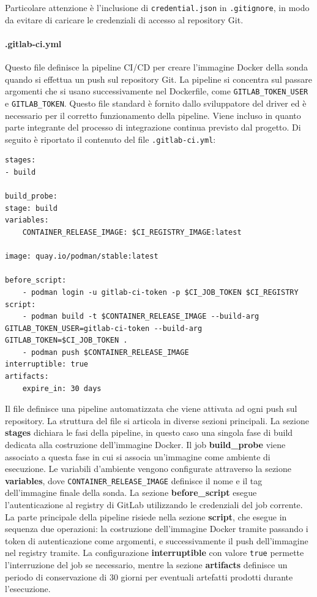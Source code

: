 Particolare attenzione è l'inclusione di \texttt{credential.json} in \texttt{.gitignore}, in modo da evitare di caricare le credenziali di accesso al repository Git. 

\paragraph{.gitlab-ci.yml} Questo file definisce la pipeline CI/CD per creare l'immagine Docker della sonda quando si effettua un push sul repository Git. La pipeline si concentra sul passare argomenti che si usano successivamente nel Dockerfile, come \texttt{GITLAB\_TOKEN\_USER} e \texttt{GITLAB\_TOKEN}. Questo file standard è fornito dallo sviluppatore del driver ed è necessario per il corretto funzionamento della pipeline. Viene incluso in quanto parte integrante del processo di integrazione continua previsto dal progetto. Di seguito è riportato il contenuto del file \texttt{.gitlab-ci.yml}:

\begin{lstlisting}[style=mygitlabci, caption={File \texttt{.gitlab-ci.yml} per la definizione della pipeline CI/CD}]
stages:
- build

build_probe:
stage: build
variables:
    CONTAINER_RELEASE_IMAGE: $CI_REGISTRY_IMAGE:latest

image: quay.io/podman/stable:latest

before_script:
    - podman login -u gitlab-ci-token -p $CI_JOB_TOKEN $CI_REGISTRY
script:
    - podman build -t $CONTAINER_RELEASE_IMAGE --build-arg GITLAB_TOKEN_USER=gitlab-ci-token --build-arg GITLAB_TOKEN=$CI_JOB_TOKEN .
    - podman push $CONTAINER_RELEASE_IMAGE
interruptible: true
artifacts:
    expire_in: 30 days
\end{lstlisting}

Il file definisce una pipeline automatizzata che viene attivata ad ogni push sul repository. La struttura del file si articola in diverse sezioni principali.
La sezione \textbf{stages} dichiara le fasi della pipeline, in questo caso una singola fase di build dedicata alla costruzione dell'immagine Docker. Il job \textbf{build\_probe} viene associato a questa fase in cui si associa un'immagine come ambiente di esecuzione.
Le variabili d'ambiente vengono configurate attraverso la sezione \textbf{variables}, dove \texttt{CONTAINER\_RELEASE\_IMAGE} definisce il nome e il tag dell'immagine finale della sonda. La sezione \textbf{before\_script} esegue l'autenticazione al registry di GitLab utilizzando le credenziali del job corrente.
La parte principale della pipeline risiede nella sezione \textbf{script}, che esegue in sequenza due operazioni: la costruzione dell'immagine Docker tramite passando i token di autenticazione come argomenti, e successivamente il push dell'immagine nel registry tramite. La configurazione \textbf{interruptible} con valore \texttt{true} permette l'interruzione del job se necessario, mentre la sezione \textbf{artifacts} definisce un periodo di conservazione di 30 giorni per eventuali artefatti prodotti durante l'esecuzione.

